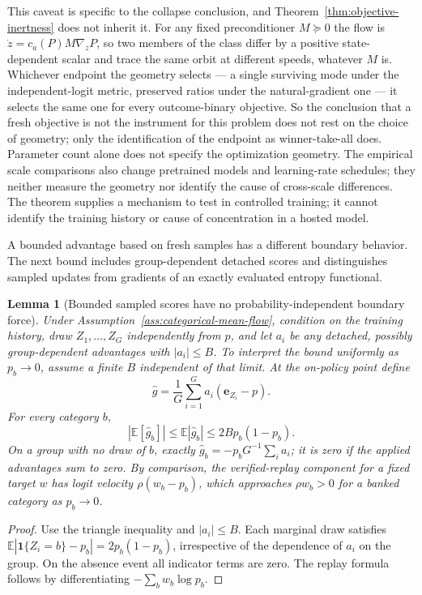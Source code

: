 \documentclass{article}
\newcommand{\1}{\mathbf 1}
\newcommand{\E}{\mathbb E}
\newtheorem{lemma}{Lemma}[section]
\theoremstyle{remark}
\theoremstyle{definition}
\theoremstyle{plain}
\begin{document}
This caveat is specific to the collapse conclusion, and
Theorem~\ref{thm:objective-inertness} does not inherit it. For any fixed
preconditioner $M\succeq0$ the flow is $\dot z=c_a(P)M\nabla_zP$, so two
members of the class differ by a positive state-dependent scalar and trace the
same orbit at different speeds, whatever $M$ is. Whichever endpoint the
geometry selects --- a single surviving mode under the independent-logit
metric, preserved ratios under the natural-gradient one --- it selects the same
one for every outcome-binary objective. So the conclusion that a fresh
objective is not the instrument for this problem does not rest on the choice of
geometry; only the identification of the endpoint as winner-take-all does.
Parameter count alone does not specify the optimization geometry. The empirical
scale
comparisons also change pretrained models and learning-rate schedules; they
neither measure the geometry nor identify the cause of cross-scale differences.
The theorem supplies a mechanism to test in controlled training; it cannot
identify the training history or cause of concentration in a hosted model.

A bounded advantage based on fresh samples has a different boundary behavior.
The next bound includes group-dependent detached scores and distinguishes
sampled updates from gradients of an exactly evaluated entropy functional.

\begin{lemma}[Bounded sampled scores have no probability-independent boundary force]
\label{lem:sampled-score-bound}
Under Assumption~\ref{ass:categorical-mean-flow}, condition on the training history, draw
$Z_1,\ldots,Z_G$ independently from $p$, and let $a_i$ be any detached,
possibly group-dependent advantages with $|a_i|\le B$. To interpret the
bound uniformly as $p_b\to0$, assume a finite $B$ independent of that limit.
At the on-policy point define
\[
 \widehat g=\frac1G\sum_{i=1}^G a_i(\mathbf e_{Z_i}-p).
\]
For every category $b$,
\[
 |\E[\widehat g_b]|\le\E|\widehat g_b|
 \le 2B p_b(1-p_b).
\]
On a group with no draw of $b$, exactly
$\widehat g_b=-p_bG^{-1}\sum_i a_i$; it is zero if the applied advantages
sum to zero. By comparison, the verified-replay component for a fixed target
$w$ has logit velocity $\rho(w_b-p_b)$, which approaches $\rho w_b>0$
for a banked category as $p_b\to0$.
\end{lemma}

\begin{proof}
Use the triangle inequality and $|a_i|\le B$. Each marginal draw satisfies
$\E|\1\{Z_i=b\}-p_b|=2p_b(1-p_b)$, irrespective of the dependence of
$a_i$ on the group. On the absence event all indicator terms are zero.
The replay formula follows by differentiating $-\sum_b w_b\log p_b$.
\end{proof}
\end{document}
